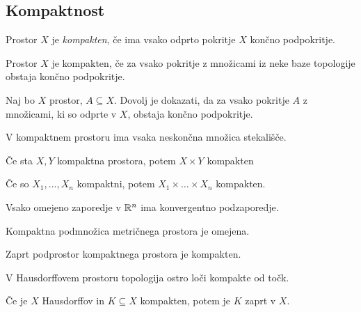 \subsection{Kompaktnost}
\begin{definicija}
    Prostor $X$ je \emph{kompakten}, če ima vsako odprto pokritje $X$ končno podpokritje.
\end{definicija}

\begin{trditev}
    Prostor $X$ je kompakten, če za vsako pokritje z množicami iz neke baze topologije obstaja končno podpokritje.
\end{trditev}

\begin{opomba}
    Naj bo $X$ prostor, $A \subseteq X$. Dovolj je dokazati, da za vsako pokritje $A$ z množicami, ki so odprte v $X$, obstaja končno podpokritje.
\end{opomba}

\begin{izrek}
    V kompaktnem prostoru ima vsaka neskončna množica stekališče.
\end{izrek}

\begin{izrek}
    Če sta $X, Y$ kompaktna prostora, potem $X \times Y$ kompakten
\end{izrek}

\begin{posledica}
    Če so $X_1, \ldots, X_n$ kompaktni, potem $X_1 \times \ldots \times X_n$ kompakten.
\end{posledica}

\begin{izrek}
    Vsako omejeno zaporedje v $\mathbb{R}^n$ ima konvergentno podzaporedje.
\end{izrek}

\begin{trditev}
    Kompaktna podmnožica metričnega prostora je omejena.
\end{trditev}

\begin{trditev}
    Zaprt podprostor kompaktnega prostora je kompakten.
\end{trditev}

\begin{trditev}
    V Hausdorffovem prostoru topologija ostro loči kompakte od točk.
\end{trditev}

\begin{trditev}
    Če je $X$ Hausdorffov in $K \subseteq X$ kompakten, potem je $K$ zaprt v $X$.
\end{trditev}

